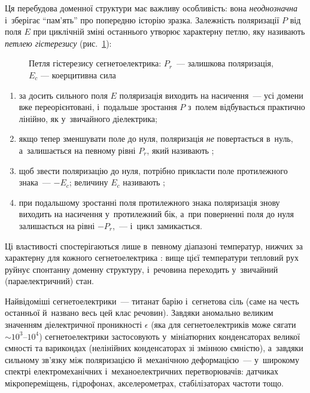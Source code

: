 Ця перебудова доменної структури має важливу особливість: вона \emph{неоднозначна}
і~зберігає \enquote{пам'ять} про попередню історію зразка. Залежність поляризації $P$ від
поля $E$ при циклічній зміні останнього утворює характерну петлю, яку називають
\emph{петлею гістерезису} (рис.~\ref{pic:HysteresisE}):

\begin{figure}[h!]\centering
	\caption{Петля гістерезису сегнетоелектрика: $P_r$~--- залишкова поляризація, $E_c$
		--- коерцитивна сила\label{pic:HysteresisE}}
\end{figure}
\begin{enumerate}
	\item за досить сильного поля $E$ поляризація виходить на насичення~--- усі домени вже
	      переорієнтовані, і~подальше зростання $P$ з~полем відбувається практично лінійно, як
	      у~звичайного діелектрика;
	\item якщо тепер зменшувати поле до нуля, поляризація \emph{не} повертається в~нуль,
	      а~залишається на певному рівні $P_r$, який називають ;
	\item щоб звести поляризацію до нуля, потрібно прикласти поле протилежного знака~---
	      $-E_c$; величину $E_c$ називають ;
	\item при подальшому зростанні поля протилежного знака поляризація знову виходить на
	      насичення у~протилежний бік, а~при поверненні поля до нуля залишається на рівні
	      $-P_r$,~--- і~цикл замикається.
\end{enumerate}
Ці властивості спостерігаються лише в~певному діапазоні температур, нижчих за характерну
для кожного сегнетоелектрика : вище цієї температури тепловий рух
руйнує спонтанну доменну структуру, і~речовина переходить у~звичайний (параелектричний)
стан.

Найвідоміші сегнетоелектрики~--- титанат барію  і~сегнетова сіль
 (саме на честь останньої й~названо весь цей клас речовин). Завдяки
аномально великим значенням діелектричної проникності $\epsilon$ (яка для
сегнетоелектриків може сягати $\sim 10^3$--$10^4$) сегнетоелектрики застосовують
у~мініатюрних конденсаторах великої ємності та варикондах (нелінійних конденсаторах зі
змінною ємністю), а~завдяки сильному зв'язку між поляризацією й~механічною деформацією~---
у~широкому спектрі електромеханічних і~механоелектричних перетворювачів: датчиках
мікропереміщень, гідрофонах, акселерометрах, стабілізаторах частоти тощо.


